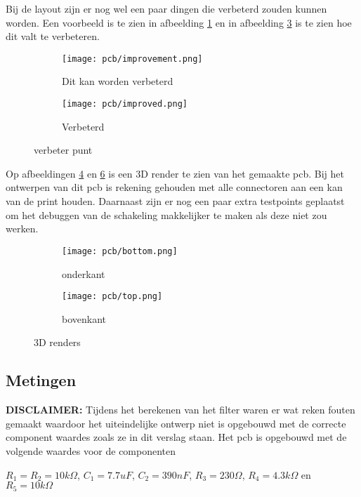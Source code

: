 	\noindent
	Bij de layout zijn er nog wel een paar dingen die verbeterd zouden kunnen worden. Een voorbeeld is te zien in afbeelding \ref{fig:pcb:verbeter}
	en in afbeelding \ref{fig:pcb:verbeterde} is te zien hoe dit valt te verbeteren. 
	\begin{figure}[!htb]
		\begin{subfigure}[b]{0.33\textwidth}
			\texttt{[image: pcb/improvement.png]}
			\caption{Dit kan worden verbeterd}
			\label{fig:pcb:verbeter}
		\end{subfigure}
		\begin{subfigure}[b]{0.33\textwidth}
			\texttt{[image: pcb/improved.png]}
			\caption{Verbeterd}
			\label{fig:pcb:verbeterde}
		\end{subfigure}
		\caption{verbeter punt}
	\end{figure}

	\noindent
	Op afbeeldingen \ref{fig:pcb:3dBottom} en \ref{fig:pcb:3dTop} is een 3D render te zien van het gemaakte pcb. Bij het ontwerpen van dit pcb is 
	rekening gehouden met alle connectoren aan een kan van de print houden. Daarnaast zijn er nog een paar extra testpoints geplaatst om het debuggen
	van de schakeling makkelijker te maken als deze niet zou werken.
	\begin{figure}[!htb]
		\centering
		\begin{subfigure}[b]{0.45\textwidth}
			\texttt{[image: pcb/bottom.png]}
			\caption{onderkant}
			\label{fig:pcb:3dBottom}
		\end{subfigure}
		\begin{subfigure}[b]{0.45\textwidth}
			\texttt{[image: pcb/top.png]}
			\caption{bovenkant}
			\label{fig:pcb:3dTop}
		\end{subfigure}
		\caption{3D renders}
	\end{figure}
	
\newpage


\subsection{Metingen}
\textbf{DISCLAIMER:} Tijdens het berekenen van het filter waren er wat reken fouten gemaakt waardoor het uiteindelijke ontwerp 
niet is opgebouwd met de correcte component waardes zoals ze in dit verslag staan. Het pcb is opgebouwd met de volgende waardes voor de componenten

\noindent
$R_1=R_2=10k\Omega$, $C_1=7.7uF$, $C_2=390nF$, $R_3=230\Omega$, $R_4=4.3k\Omega$ en $R_5=10k\Omega$
\\ 

